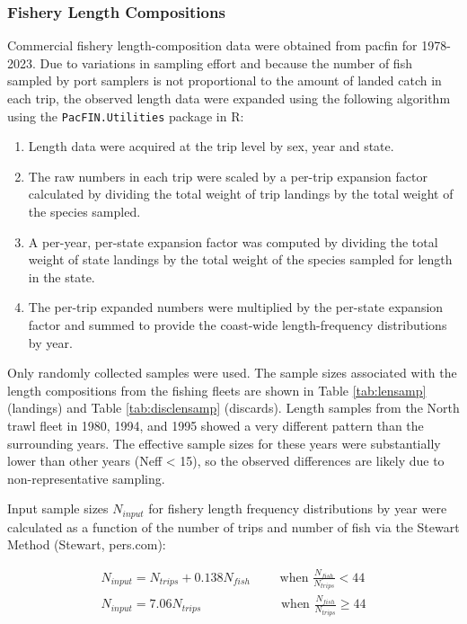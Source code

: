 \documentclass[11pt,
  english,
  letterpaper,
]{article}
\providecommand{\tightlist}{%
  \setlength{\itemsep}{0pt}\setlength{\parskip}{0pt}}
\providecommand{\tightlist}{%
  \setlength{\itemsep}{0pt}\setlength{\parskip}{0pt}}
\begin{document}
\hypertarget{fishery-length-compositions}{%
\subsubsection{Fishery Length Compositions}\label{fishery-length-compositions}}

Commercial fishery length-composition data were obtained from \gls{pacfin} for 1978-2023. Due to variations in sampling effort and because the number of fish sampled by port samplers is not proportional to the amount of landed catch in each trip, the observed length data were expanded using the following algorithm using the \texttt{PacFIN.Utilities} package in R:

\begin{enumerate}
\def\labelenumi{\arabic{enumi}.}
\tightlist
\item
  Length data were acquired at the trip level by sex, year and state.
\item
  The raw numbers in each trip were scaled by a per-trip expansion factor calculated by dividing the total weight of trip landings by the total weight of the species sampled.
\item
  A per-year, per-state expansion factor was computed by dividing the total weight of state landings by the total weight of the species sampled for length in the state.
\item
  The per-trip expanded numbers were multiplied by the per-state expansion factor and summed to provide the coast-wide length-frequency distributions by year.
\end{enumerate}

Only randomly collected samples were used. The sample sizes associated with the length compositions from the fishing fleets are shown in Table \ref{tab:lensamp} (landings) and Table \ref{tab:disclensamp} (discards). Length samples from the North trawl fleet in 1980, 1994, and 1995 showed a very different pattern than the surrounding years. The effective sample sizes for these years were substantially lower than other years (Neff \textless{} 15), so the observed differences are likely due to non-representative sampling.

Input sample sizes \({N_{input}}\) for fishery length frequency distributions by year were calculated as a function of the number of trips and number of fish via the Stewart Method (Stewart, pers.com):

\begin{align*}{N_{input} = N_{trips} + 0.138N_{fish}}\qquad\text{ when }\frac{N_{fish}}{N_{trips}}<44 \\
{N_{input} = 7.06N_{trips}}\qquad\qquad\qquad\text{ when }\frac{N_{fish}}{N_{trips}}\ge 44 \end{align*}
\end{document}
